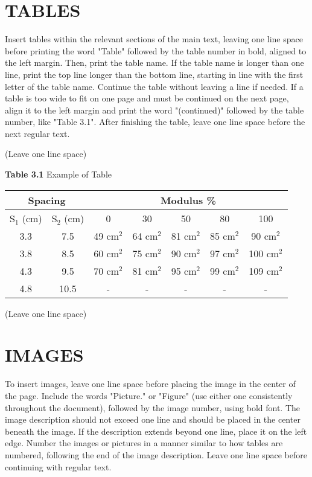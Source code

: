 \section{TABLES}

Insert tables within the relevant sections of the main text, leaving one line space before printing the word "Table" followed by the table number in bold, aligned to the left margin. Then, print the table name. If the table name is longer than one line, print the top line longer than the bottom line, starting in line with the first letter of the table name. Continue the table without leaving a line if needed. If a table is too wide to fit on one page and must be continued on the next page, align it to the left margin and print the word "(continued)" followed by the table number, like "Table 3.1". After finishing the table, leave one line space before the next regular text.

(Leave one line space)

\textbf{Table 3.1} Example of Table

\begin{table}[h]
\centering
\begin{tabular}{|c|c|c|c|c|c|c|}
\hline
\multicolumn{2}{|c|}{Spacing} & \multicolumn{5}{c|}{Modulus \%} \\
\hline
S$_1$ (cm) & S$_2$ (cm) & 0 & 30 & 50 & 80 & 100 \\
\hline
3.3 & 7.5 & 49 cm$^2$ & 64 cm$^2$ & 81 cm$^2$ & 85 cm$^2$ & 90 cm$^2$ \\
3.8 & 8.5 & 60 cm$^2$ & 75 cm$^2$ & 90 cm$^2$ & 97 cm$^2$ & 100 cm$^2$ \\
4.3 & 9.5 & 70 cm$^2$ & 81 cm$^2$ & 95 cm$^2$ & 99 cm$^2$ & 109 cm$^2$ \\
4.8 & 10.5 & - & - & - & - & - \\
\hline
\end{tabular}
\end{table}

(Leave one line space)

\section{IMAGES}

To insert images, leave one line space before placing the image in the center of the page. Include the words "Picture." or "Figure" (use either one consistently throughout the document), followed by the image number, using bold font. The image description should not exceed one line and should be placed in the center beneath the image. If the description extends beyond one line, place it on the left edge. Number the images or pictures in a manner similar to how tables are numbered, following the end of the image description. Leave one line space before continuing with regular text.

